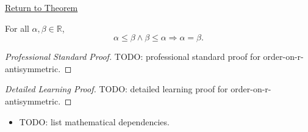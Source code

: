 \newpage
{}
\label{prf:order-on-r-antisymmetric}

\begin{remark*}[Return]
\hyperref[thm:order-on-r-antisymmetric]{Return to Theorem}
\end{remark*}

\begin{theorem*}
For all $\alpha,\beta\in\mathbb{R}$,
\[
\alpha\le\beta\land\beta\le\alpha \Longrightarrow \alpha=\beta.
\]
\end{theorem*}

\begin{proof}[Professional Standard Proof]
\LRAProofBodyStart
TODO: professional standard proof for order-on-r-antisymmetric.
\end{proof}

\begin{proof}[Detailed Learning Proof]
\LRAProofBodyStart
TODO: detailed learning proof for order-on-r-antisymmetric.
\end{proof}

\begin{remark*}
\end{remark*}

\begin{dependencies}
\begin{itemize}
  \item TODO: list mathematical dependencies.
\end{itemize}
\end{dependencies}

\clearpage

